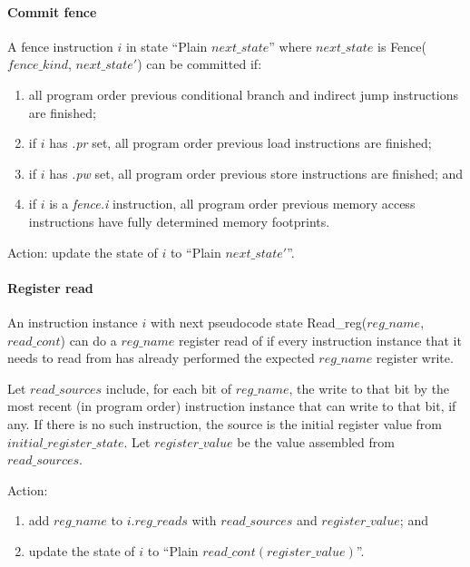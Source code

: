 \paragraph{Commit fence}\label{omm:thread:commit_barrier}
A fence instruction $i$ in state ``{\sc Plain} $next\_state$'' where $next\_state$ is {\sc Fence}($fence\_kind$, $next\_state'$) can be committed if:
\begin{enumerate}
\item all program order previous conditional branch and indirect jump instructions are finished;
\item if $i$ has {\em .pr} set, all program order previous load instructions are finished;
\item if $i$ has {\em .pw} set, all program order previous store instructions are finished; and
\item if $i$ is a {\em fence.i} instruction, all program order previous memory access instructions have fully determined memory footprints. 
\end{enumerate}
Action: update the state of $i$ to ``{\sc Plain} $next\_state'$''.


\paragraph{Register read}\label{omm:thread:reg_read}
An instruction instance $i$ with next pseudocode state {\sc Read\_reg}($reg\_name$, $read\_cont$) can do a $reg\_name$ register read of if every instruction instance that it needs to read from has already performed the expected $reg\_name$ register write.

Let $read\_sources$ include, for each bit of $reg\_name$, the write to that bit by the most recent (in program order) instruction instance that can write to that bit, if any. If there is no such instruction, the source is the initial register value from $initial\_register\_state$.
Let  $register\_value$ be the value assembled from $read\_sources$.

Action:
\begin{enumerate}
\item add $reg\_name$ to $i.reg\_reads$ with $read\_sources$ and $register\_value$; and
\item update the state of $i$ to ``{\sc Plain} $read\_cont(register\_value)$''.
\end{enumerate}


